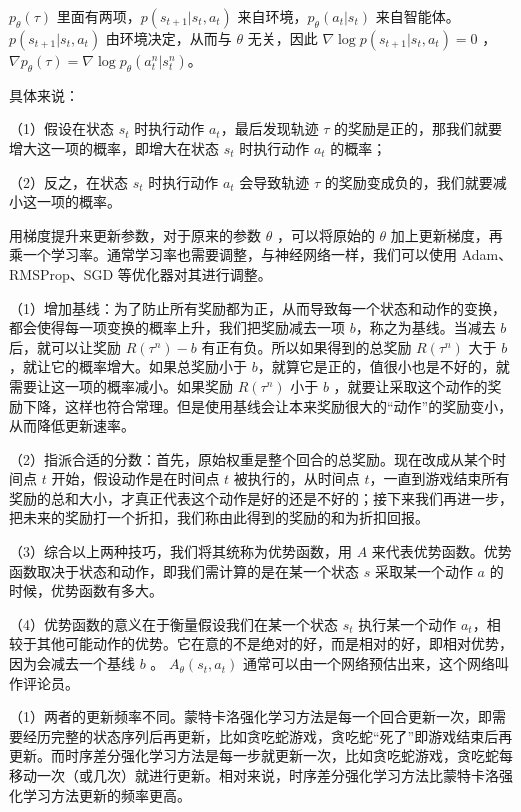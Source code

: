 $p_{\theta}(\tau)$ 里面有两项，$p(s_{t+1}|s_t,a_t)$ 来自环境，$p_\theta(a_t|s_t)$ 来自智能体。 $p(s_{t+1}|s_t,a_t)$ 由环境决定，从而与 $\theta$ 无关，因此 $\nabla \log p(s_{t+1}|s_t,a_t) =0 $ ， $\nabla p_{\theta}(\tau)=\nabla \log p_{\theta}\left(a_{t}^{n} | s_{t}^{n}\right)$。

具体来说：

（1）假设在状态 $s_t$ 时执行动作 $a_t$，最后发现轨迹 $\tau$ 的奖励是正的，那我们就要增大这一项的概率，即增大在状态 $s_t$ 时执行动作 $a_t$ 的概率；

（2）反之，在状态 $s_t$ 时执行动作 $a_t$ 会导致轨迹 $\tau$ 的奖励变成负的，我们就要减小这一项的概率。


用梯度提升来更新参数，对于原来的参数 $\theta$ ，可以将原始的 $\theta$ 加上更新梯度，再乘一个学习率。通常学习率也需要调整，与神经网络一样，我们可以使用 Adam、RMSProp、SGD 等优化器对其进行调整。
 

（1）增加基线：为了防止所有奖励都为正，从而导致每一个状态和动作的变换，都会使得每一项变换的概率上升，我们把奖励减去一项 $b$，称之为基线。当减去 $b$ 后，就可以让奖励 $R(\tau^n)-b$ 有正有负。所以如果得到的总奖励 $R(\tau^n)$ 大于 $b$ ，就让它的概率增大。如果总奖励小于 $b$，就算它是正的，值很小也是不好的，就需要让这一项的概率减小。如果奖励 $R(\tau^n)$ 小于 $b$ ，就要让采取这个动作的奖励下降，这样也符合常理。但是使用基线会让本来奖励很大的“动作”的奖励变小，从而降低更新速率。

（2）指派合适的分数：首先，原始权重是整个回合的总奖励。现在改成从某个时间点 $t$ 开始，假设动作是在时间点 $t$ 被执行的，从时间点 $t$，一直到游戏结束所有奖励的总和大小，才真正代表这个动作是好的还是不好的；接下来我们再进一步，把未来的奖励打一个折扣，我们称由此得到的奖励的和为折扣回报。

（3）综合以上两种技巧，我们将其统称为优势函数，用 $A$ 来代表优势函数。优势函数取决于状态和动作，即我们需计算的是在某一个状态 $s$ 采取某一个动作 $a$ 的时候，优势函数有多大。

（4）优势函数的意义在于衡量假设我们在某一个状态 $s_t$ 执行某一个动作 $a_t$，相较于其他可能动作的优势。它在意的不是绝对的好，而是相对的好，即相对优势，因为会减去一个基线 $b$ 。 $A_{\theta}\left(s_{t}, a_{t}\right)$ 通常可以由一个网络预估出来，这个网络叫作评论员。


（1）两者的更新频率不同。蒙特卡洛强化学习方法是每一个回合更新一次，即需要经历完整的状态序列后再更新，比如贪吃蛇游戏，贪吃蛇“死了”即游戏结束后再更新。而时序差分强化学习方法是每一步就更新一次，比如贪吃蛇游戏，贪吃蛇每移动一次（或几次）就进行更新。相对来说，时序差分强化学习方法比蒙特卡洛强化学习方法更新的频率更高。


